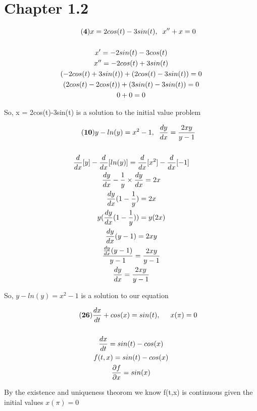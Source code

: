 \documentclass{article}
\begin{document}
\section*{Chapter 1.2} 
    \begin{gather*}\tag{\textbf{4}}
        x = 2cos(t)-3sin(t) ,\hspace{.2cm}x'' + x = 0 \\ \\
            x' = -2sin(t)-3cos(t) \\
            x'' = -2cos(t)+3sin(t)\\
            (-2cos(t)+3sin(t)) + (2cos(t)-3sin(t)) = 0\\
            (2cos(t)-2cos(t)) + (3sin(t)-3sin(t)) = 0\\
            0 + 0 = 0
    \end{gather*}
    \begin{center}
    So, x = 2cos(t)-3sin(t) is a solution to the initial value problem
    \end{center}
    \begin{gather*}\tag{\textbf{10}}
        y-ln(y)=x^2-1, \hspace{.2cm} \frac{dy}{dx} = \frac{2xy}{y-1} \\\\
        \frac{d}{dx}[y] - \frac{d}{dx}[ln(y)] = \frac{d}{dx}[x^2] - \frac{d}{dx}[-1]\\
        \frac{dy}{dx} - \frac{1}{y} \times \frac{dy}{dx} = 2x\\
        \frac{dy}{dx} (1-\frac{1}{y}) = 2x\\
        y(\frac{dy}{dx} (1-\frac{1}{y})) = y(2x)\\
        \frac{dy}{dx}(y-1) = 2xy\\
        \frac{\frac{dy}{dx}(y-1)}{y-1} = \frac{2xy}{y-1}\\
        \frac{dy}{dx} = \frac{2xy}{y-1}\\
    \end{gather*}
    \begin{center}
        So, $y-ln(y)=x^2-1$ is a solution to our equation
    \end{center}
    \begin{gather*}\tag{\textbf{26}}
        \frac{dx}{dt} + cos(x) = sin(t),\hspace{.5cm}x(\pi)=0\\\\
        \frac{dx}{dt} = sin(t)-cos(x)\\
        f(t,x) = sin(t)-cos(x)\\
        \frac{\partial f}{\partial x} = sin(x)
    \end{gather*}
    \begin{center}
        By the existence and uniqueness theorom we know f(t,x) is continuous given the initial values $x(\pi)=0$
    \end{center}
\end{document}
